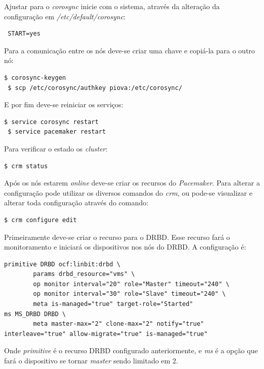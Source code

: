 Ajustar para o \textit{corosync} inicie com o sistema, através da alteração da configuração em \textit{/etc/default/corosync}:
\begin{lstlisting}
 START=yes
\end{lstlisting}

Para a comunicação entre os nós deve-se criar uma chave e copiá-la para o outro nó:
\begin{lstlisting}[language=bash]
 $ corosync-keygen
 $ scp /etc/corosync/authkey piova:/etc/corosync/
\end{lstlisting}

E por fim deve-se reiniciar os serviços:
\begin{lstlisting}[language=bash]
 $ service corosync restart
 $ service pacemaker restart
\end{lstlisting}

Para verificar o estado os \textit{cluster}:
\begin{lstlisting}[language=bash]
 $ crm status
\end{lstlisting}

Após os nós estarem \textit{online} deve-se criar os recursos do \textit{Pacemaker}. Para alterar a configuração pode utilizar os diversos
comandos do \textit{crm}, ou pode-se visualizar e alterar toda configuração através do comando:
\begin{lstlisting}[language=bash]
 $ crm configure edit
\end{lstlisting}

Primeiramente deve-se criar o recurso para o \ac{DRBD}. Esse recurso fará o monitoramento e iniciará os dispositivos nos nós do \ac{DRBD}.
A configuração é:
\begin{lstlisting}
primitive DRBD ocf:linbit:drbd \
        params drbd_resource="vms" \
        op monitor interval="20" role="Master" timeout="240" \
        op monitor interval="30" role="Slave" timeout="240" \
        meta is-managed="true" target-role="Started"
ms MS_DRBD DRBD \
        meta master-max="2" clone-max="2" notify="true" interleave="true" allow-migrate="true" is-managed="true" 
\end{lstlisting}
Onde \textit{primitive} é o recurso \ac{DRBD} configurado anteriormente, e \textit{ms} é a opção que fará o dispositivo se tornar \textit{master}
sendo limitado em 2.

